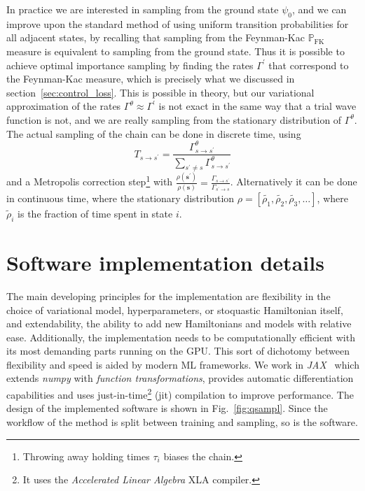 In practice we are interested in sampling from the ground state $\psi_0$, and we can improve upon the standard method of using uniform transition probabilities for all adjacent states, by recalling that sampling from the Feynman-Kac $\mathbb{P}_\text{FK}$ measure is equivalent to sampling from the ground state. Thus it is possible to achieve optimal importance sampling by finding the rates $\Gamma^\prime$ that correspond to the Feynman-Kac measure, which is precisely what we discussed in section~\ref{sec:control_loss}. This is possible in theory, but our variational approximation of the rates $\Gamma^{\theta} \approx \Gamma^\prime$ is not exact in the same way that a trial wave function is not, and we are really sampling from the stationary distribution of $\Gamma^\theta$. The actual sampling of the chain can be done in discrete time, using
\begin{equation}
	T_{s \rightarrow s^{\prime}}=\frac{\Gamma_{s \rightarrow s^{\prime}}^{\theta}}{\sum_{s^{\prime} \neq s} \Gamma_{s \rightarrow s^{\prime}}^{\theta}}
\end{equation}
and a Metropolis correction step\footnote{Throwing away holding times $\tau_i$ biases the chain.} with ${\frac{\rho\left(\boldsymbol{s}^{\prime}\right)}{\rho(\boldsymbol{s})}} = \frac{\Gamma_{s \rightarrow s^{\prime}}}{\Gamma_{s^{\prime} \rightarrow s}}$. Alternatively it can be done in continuous time, where the stationary distribution $\rho = \left[ \tilde{\rho_1}, \tilde{\rho_2}, \tilde{\rho_3}, \ldots \right]$, where $\tilde \rho_i$ is the fraction of time spent in state $i$.

\section{Software implementation details}
\label{sec:qoptsampl}
The main developing principles for the implementation are flexibility in the choice of variational model, hyperparameters, or stoquastic Hamiltonian itself, and extendability, the ability to add new Hamiltonians and models with relative ease. Additionally, the implementation needs to be computationally efficient with its most demanding parts running on the GPU. This sort of dichotomy between flexibility and speed is aided by modern ML frameworks. We work in \emph{JAX}~\cite{jax2018github} which extends \emph{numpy} with \emph{function transformations}, provides automatic differentiation capabilities and uses just-in-time\footnote{It uses the \emph{Accelerated Linear Algebra} XLA compiler.} (jit) compilation to improve performance. The design of the implemented software is shown in Fig.~\ref{fig:qsampl}. Since the workflow of the method is split between training and sampling, so is the software.

